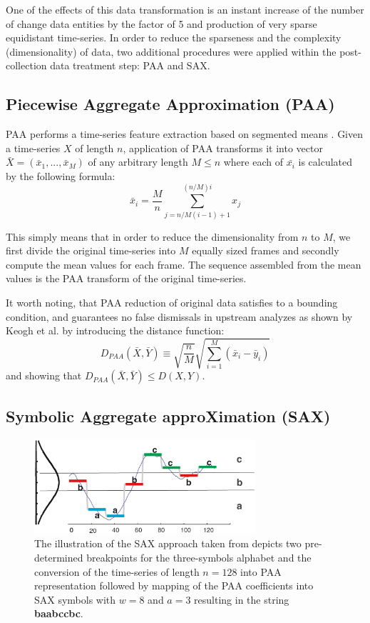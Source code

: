 \documentclass[conference]{IEEEtran}
\begin{document}
One of the effects of this data transformation is an instant increase of the number of
change data entities by the factor of 5 and production of very sparse equidistant time-series.
In order to reduce the sparseness and the complexity (dimensionality) of data, 
two additional procedures were applied within the post-collection data treatment step: PAA and SAX.

\subsection{Piecewise Aggregate Approximation (PAA)} \label{paa}
PAA performs a time-series feature extraction based on segmented means \cite{citeulike:2946589}. 
Given a time-series $X$ 
of length $n$, application of PAA transforms it into vector $\bar{X} = ( \bar{x}_{1}, ..., \bar{x}_{M} )$ of 
any arbitrary length $M \leq n$ where each of $\bar{x_{i}}$ is calculated by the following formula:
\begin{equation}
\bar{x}_{i} = \frac{M}{n} \sum_{j=n/M(i-1)+1}^{(n/M)i} x_{j}
\label{eq:paa}
\end{equation}

This simply means that in order to reduce the dimensionality from $n$ to $M$, 
we first divide the original time-series into $M$ equally sized frames and secondly compute the mean 
values for each frame. The sequence assembled from the mean values is the PAA transform of 
the original time-series. 

It worth noting, that PAA reduction of original data satisfies to a bounding condition, and 
guarantees no false dismissals in upstream analyzes as shown by Keogh et al. \cite{citeulike:3000416}
by introducing the distance function:
\begin{equation}
D_{PAA}(\bar{X}, \bar{Y}) \equiv \sqrt{\frac{n}{M}} \sqrt{ \sum_{i=1}^{M} 
\left(  \bar{x}_{i} - \bar{y}_{i} \right)}
\label{eq:paa_distance}
\end{equation}
and showing that $D_{PAA}(\bar{X}, \bar{Y}) \leq D(X,Y)$.

\subsection{Symbolic Aggregate approXimation (SAX)} \label{sax}
\begin{figure}[b]
   \centering
   \includegraphics[height=35mm]{figures/sax_intro.eps}
   \caption{The illustration of the SAX approach taken from \cite{citeulike:2821475} depicts 
    two pre-determined breakpoints for the three-symbols alphabet and the conversion of the time-series of 
    length $n=128$ into PAA representation followed by mapping of the PAA coefficients into SAX symbols with 
    $w=8$ and $a=3$ resulting in the string \textbf{baabccbc}.}
   \label{fig:sax_intro}
\end{figure}
\end{document}

